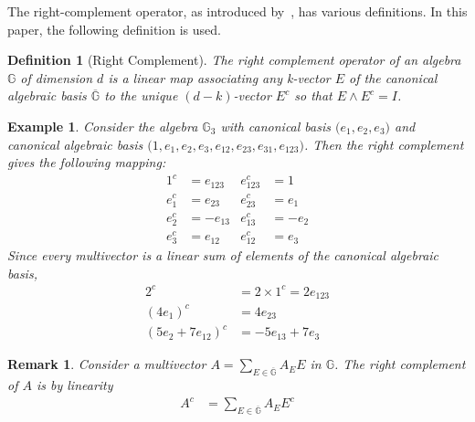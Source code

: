 \documentclass{birkjour}
\newtheorem{definition}{Definition}
\newtheorem{remark}{Remark}
\newtheorem{example}{Example}
\begin{document}
The right-complement operator, as introduced by~\cite{gunn2022bit}, has various definitions. In this paper, the following definition is used.
\begin{definition}[Right Complement]
The right complement operator of an algebra \(\mathbb{G}\) of dimension \(d\) is a linear map associating any k-vector \(E\) of the canonical algebraic basis \(\overline{\mathbb{G}}\) to the unique \((d-k)\)-vector \(E^c\) so that \(E\wedge E^c = I\). 
\end{definition}

\begin{example}
    Consider the algebra \(\mathbb{G}_3\) with canonical basis \(\big(e_1,e_2,e_3\big)\) and canonical algebraic basis \(\big(1,e_1,e_2,e_3,e_{12},e_{23},e_{31},e_{123}\big)\).  Then the right complement gives the following mapping:
    \begin{align}
            1^c &=  e_{123} & e_{123}^c &= 1     \\
        e_{1}^c &=  e_{23}  &  e_{23}^c &=  e_{1} \\
        e_{2}^c &= -e_{13}  &  e_{13}^c &= -e_{2} \\
        e_{3}^c &=  e_{12}  &  e_{12}^c &=  e_{3} 
    \end{align}
     Since every multivector is a linear sum of elements of the canonical algebraic basis, 
    \begin{align}
                2^c &= 2 \times 1^c =   2 e_{123} \\
        (4 e_{1})^c &=  4 e_{23}   \\
        (5e_{2} + 7e_{12})^c &= -5e_{13} + 7e_{3} 
    \end{align}
\end{example}

\begin{remark}
Consider a multivector \(A=\sum_{E\in\overline{\mathbb{G}}} A_E E\) in \(\mathbb{G}\). The right complement of \(A\) is by linearity
\begin{align}
    A^c &= \sum_{E\in\overline{\mathbb{G}}} A_E E^c
\end{align}
\end{remark}
\end{document}
